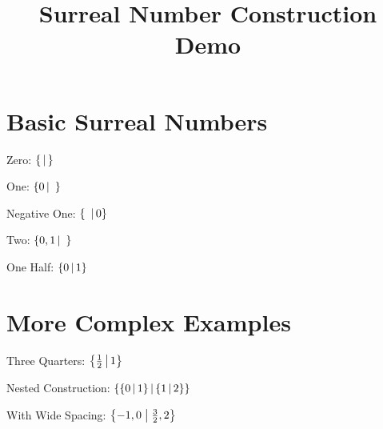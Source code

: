 \documentclass{article}
\begin{document}
\title{Surreal Number Construction Demo}
\maketitle

\section{Basic Surreal Numbers}

Zero: $\left\{\,\middle|\,\right\}$

One: $\left\{0 \,\middle|\, \ \right\}$

Negative One: $\left\{\  \,\middle|\, 0\right\}$

Two: $\left\{0,1 \,\middle|\, \ \right\}$

One Half: $\left\{0 \,\middle|\, 1\right\}$

\section{More Complex Examples}

Three Quarters: $\left\{\frac{1}{2} \,\middle|\, 1\right\}$

Nested Construction: $\left\{\left\{0 \,\middle|\, 1\right\} \,\middle|\, \left\{1 \,\middle|\, 2\right\}\right\}$

With Wide Spacing: $\left\{ -1, 0 \;\middle|\; \frac{3}{2}, 2 \right\}$
\end{document}

